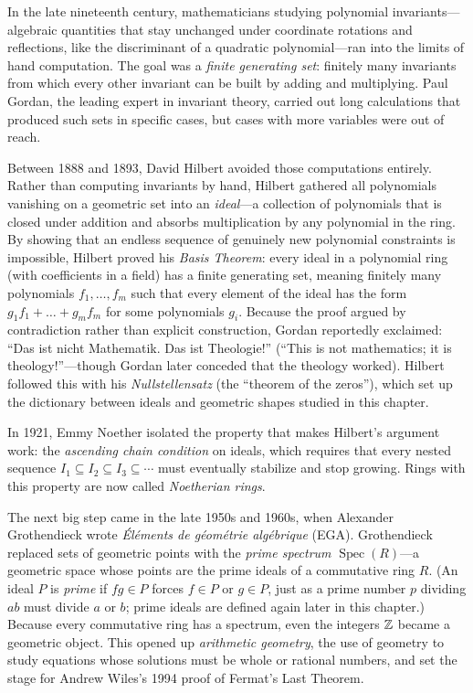 \begin{historybox}
In the late nineteenth century, mathematicians studying polynomial invariants---algebraic quantities that stay unchanged under coordinate rotations and reflections, like the discriminant of a quadratic polynomial---ran into the limits of hand computation. The goal was a \emph{finite generating set}: finitely many invariants from which every other invariant can be built by adding and multiplying. Paul Gordan, the leading expert in invariant theory, carried out long calculations that produced such sets in specific cases, but cases with more variables were out of reach.

Between 1888 and 1893, David Hilbert avoided those computations entirely. Rather than computing invariants by hand, Hilbert gathered all polynomials vanishing on a geometric set into an \emph{ideal}---a collection of polynomials that is closed under addition and absorbs multiplication by any polynomial in the ring. By showing that an endless sequence of genuinely new polynomial constraints is impossible, Hilbert proved his \emph{Basis Theorem}: every ideal in a polynomial ring (with coefficients in a field) has a finite generating set, meaning finitely many polynomials $f_1, \dots, f_m$ such that every element of the ideal has the form $g_1 f_1 + \dots + g_m f_m$ for some polynomials $g_i$. Because the proof argued by contradiction rather than explicit construction, Gordan reportedly exclaimed: ``Das ist nicht Mathematik. Das ist Theologie!'' (``This is not mathematics; it is theology!''---though Gordan later conceded that the theology worked). Hilbert followed this with his \emph{Nullstellensatz} (the ``theorem of the zeros''), which set up the dictionary between ideals and geometric shapes studied in this chapter.

In 1921, Emmy Noether isolated the property that makes Hilbert's argument work: the \emph{ascending chain condition} on ideals, which requires that every nested sequence $I_1 \subseteq I_2 \subseteq I_3 \subseteq \cdots$ must eventually stabilize and stop growing. Rings with this property are now called \emph{Noetherian rings}.

The next big step came in the late 1950s and 1960s, when Alexander Grothendieck wrote \emph{\'El\'ements de g\'eom\'etrie alg\'ebrique} (EGA). Grothendieck replaced sets of geometric points with the \emph{prime spectrum} $\operatorname{Spec}(R)$---a geometric space whose points are the prime ideals of a commutative ring $R$. (An ideal $P$ is \emph{prime} if $fg \in P$ forces $f \in P$ or $g \in P$, just as a prime number $p$ dividing $ab$ must divide $a$ or $b$; prime ideals are defined again later in this chapter.) Because every commutative ring has a spectrum, even the integers $\mathbb{Z}$ became a geometric object. This opened up \emph{arithmetic geometry}, the use of geometry to study equations whose solutions must be whole or rational numbers, and set the stage for Andrew Wiles's 1994 proof of Fermat's Last Theorem.


\end{historybox}
